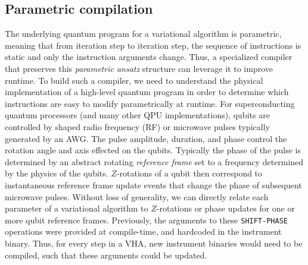 \documentclass[12pt]{iopart}
\begin{document}
\subsection{Parametric compilation}

The underlying quantum program for a variational algorithm is parametric, meaning that from iteration step to iteration step, the sequence of instructions is static and only the instruction arguments change. Thus, a specialized compiler that preserves this \textit{parametric ansatz} structure can leverage it to improve runtime. To build such a compiler, we need to understand the physical implementation of a high-level quantum program in order to determine which instructions are easy to modify parametrically at runtime. For superconducting quantum processors (and many other QPU implementations), qubits are controlled by shaped radio frequency (RF) or microwave pulses typically generated by an AWG. The pulse amplitude, duration, and phase control the rotation angle and axis effected on the qubits. Typically the phase of the pulse is determined by an abstract rotating \textit{reference frame} set to a frequency determined by the physics of the qubits. $Z$-rotations of a qubit then correspond to instantaneous reference frame update events that change the phase of subsequent microwave pulses. Without loss of generality, we can directly relate each parameter of a variational algorithm to $Z$-rotations or phase updates for one or more qubit reference frames. Previously, the arguments to these \texttt{SHIFT-PHASE} \cite{QuilRepo} operations were provided at compile-time, and hardcoded in the instrument binary. Thus, for every step in a VHA, new instrument binaries would need to be compiled, such that these arguments could be updated.
\end{document}
